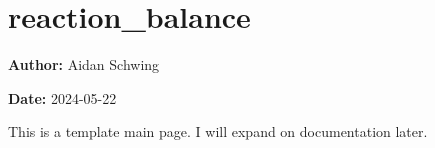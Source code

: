 \chapter{reaction\+\_\+balance}
\hypertarget{index}{}\label{index}
{\bfseries{Author\+:}} Aidan Schwing

{\bfseries{Date\+:}} 2024-\/05-\/22

This is a template main page. I will expand on documentation later. 